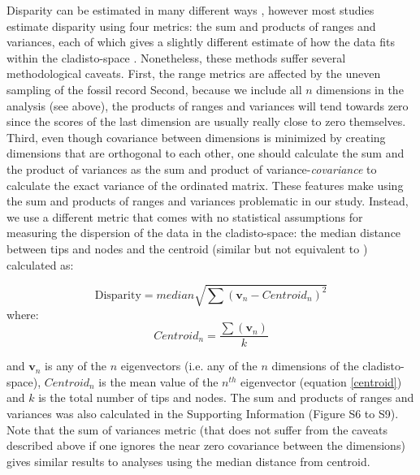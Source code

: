\documentclass[12pt,letterpaper]{article}
\begin{document}
Disparity can be estimated in many different ways \citep[e.g.][]{Wills1994,Ciampaglio2004,thorneresetting2011,hopkinsdecoupling2013,huang2015origins}, however most studies estimate disparity using four metrics: the sum and products of ranges and variances, each of which gives a slightly different estimate of how the data fits within the cladisto-space \citep{Foote01071994,Wills1994,brusatte50,Brusatte12092008,cisneros2010,thorneresetting2011,prentice2011,brusattedinosaur2012,toljagictriassic-jurassic2013,ruta2013,bentonmodels2014,bensonfaunal2014}.
Nonetheless, these methods suffer several methodological caveats.
First, the range metrics are affected by the uneven sampling of the fossil record \citep{Butler2012}
Second, because we include all $n$ dimensions in the analysis (see above), the products of ranges and variances will tend towards zero since the scores of the last dimension are usually really close to zero themselves.
Third, even though covariance between dimensions is minimized by creating dimensions that are orthogonal to each other, one should calculate the sum and the product of variances as the sum and product of variance-\textit{covariance} %
to calculate the exact variance of the ordinated matrix.
These features make using the sum and products of ranges and variances problematic in our study.
Instead, we use a different metric that comes with no statistical assumptions for measuring the dispersion of the data in the cladisto-space: the median distance between tips and nodes and the centroid (similar but not equivalent to \citealt{Wills1994,kornextinction2013,huang2015origins}) calculated as:

\begin{equation}
   \text{Disparity}=median{\displaystyle\sqrt{\sum{(\mathbf{v}_{n}-Centroid_{n})^2}}}
    \label{disparity}
\end{equation}
where:
\begin{equation}
    Centroid_{n}=\frac{\displaystyle\sum(\mathbf{v}_{n})}{k} 
    \label{centroid}
\end{equation}

\noindent
and $\mathbf{v}_{n}$ is any of the $n$ eigenvectors (i.e. any of the $n$ dimensions of the cladisto-space), $Centroid_{n}$ is the mean value of the $n^{th}$ eigenvector (equation \ref{centroid}) and $k$ is the total number of tips and nodes.
The sum and products of ranges and variances was also calculated in the Supporting Information (Figure S6 to S9).
Note that the sum of variances metric (that does not suffer from the caveats described above if one ignores the near zero covariance between the dimensions) gives similar results to analyses using the median distance from centroid. 
\end{document}
